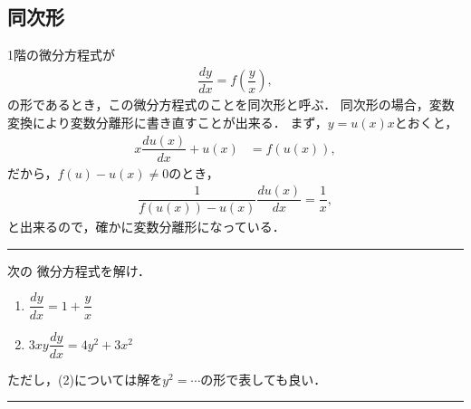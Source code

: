 \subsection{同次形}
%
1階の微分方程式が
\begin{align}
  \dfrac{dy}{dx} = f\left(\dfrac{y}{x}\right),
\end{align}
の形であるとき，この微分方程式のことを同次形と呼ぶ．
同次形の場合，変数変換により変数分離形に書き直すことが出来る．
まず，$y=u\left(x\right)x$とおくと，
\begin{align}
 x\dfrac{du\left(x\right)}{dx}+u\left(x\right) & =f\left(u\left(x\right)\right),
\end{align}
だから，$f\left(u\right) - u\left(x\right) \neq 0$のとき，
\begin{align}
 \dfrac{1}{f\left(u\left(x\right)\right)-u\left(x\right)}\dfrac{du\left(x\right)}{dx}=\dfrac{1}{x},
\end{align}
と出来るので，確かに変数分離形になっている．
%
\newpage
%
\hrule
\reidai
次の
微分方程式を解け．
\begin{enumerate}[(1)]
  \item $\dfrac{dy}{dx} = 1 + \dfrac{y}{x} $
  \item $3xy\dfrac{dy}{dx} = 4y^2 + 3x^2$ 
\end{enumerate}
ただし，(2)については解を$y^2 = \cdots$の形で表しても良い．

\vspace*{.2cm}
\hrule
\vspace*{.2cm}

